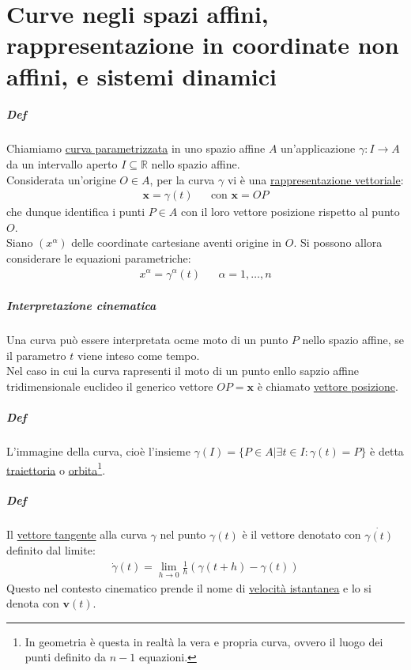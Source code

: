 \chapter{Curve negli spazi affini, rappresentazione in coordinate non affini, e sistemi dinamici}
\paragraph{Def} Chiamiamo \underline{curva parametrizzata} in uno spazio affine $A$ un'applicazione $\gamma \colon I \to A$ da un intervallo aperto $I\subseteq \mathbb{R}$ nello spazio affine.\\
Considerata un'origine $O\in A$, per la curva $\gamma$ vi è una \underline{rappresentazione vettoriale}:
\begin{align*}
    \mathbf{x}=\gamma(t)&& \text{con }\mathbf{x}=OP
\end{align*}
che dunque identifica i punti $P\in A$ con il loro vettore posizione rispetto al punto $O$.\\
Siano $(x^\alpha)$ delle coordinate cartesiane aventi origine in $O$. Si possono allora considerare le equazioni parametriche:
\begin{align*}
    x^\alpha= \gamma^\alpha(t) && \alpha=1,\dots, n
\end{align*}
\paragraph{Interpretazione cinematica}Una curva può essere interpretata ocme moto di un punto $P$ nello spazio affine, se il parametro $t$ viene inteso come tempo.\\
Nel caso in cui la curva rapresenti il moto di un punto enllo sapzio affine tridimensionale euclideo il generico vettore $OP=\mathbf{x}$ è chiamato \underline{vettore posizione}.
\paragraph{Def} L'immagine della curva, cioè l'insieme $\gamma(I)=\{P\in A | \exists t \in I: \gamma(t)=P\}$ è detta \underline{traiettoria} o \underline{orbita}\footnote{In geometria è questa in realtà la vera e propria curva, ovvero il luogo dei punti definito da $n-1$ equazioni.}.
\paragraph{Def} Il \underline{vettore tangente} alla curva $\gamma$ nel punto $\gamma(t)$ è il vettore denotato con $\dot{\gamma(t)}$ definito dal limite:
\begin{align*}
    \dot{\gamma}(t)=\lim_{h\to 0}\frac{1}{h}(\gamma(t+h)-\gamma(t))
\end{align*}
Questo nel contesto cinematico prende il nome di \underline{velocità istantanea} e lo si denota con $\mathbf{v}(t)$.
